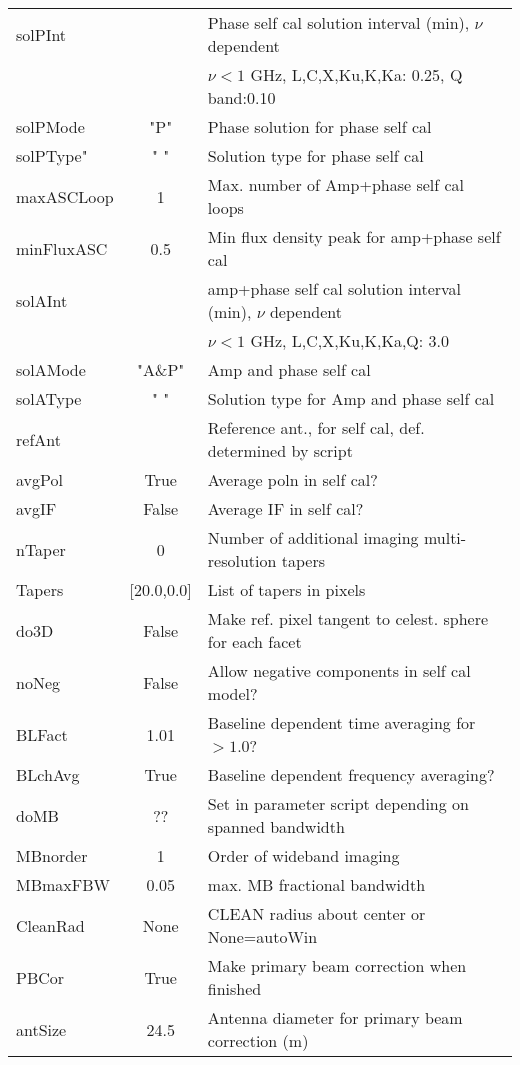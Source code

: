 \documentclass[11pt]{article}
\begin{document}
\begin{enumerate}
\begin{center}
\begin{tabular}{|l|c|l|}
solPInt     &          & Phase self cal solution interval (min), $\nu$ dependent \\
            &          &       $\nu<1$ GHz, L,C,X,Ku,K,Ka: 0.25, Q band:0.10\\
solPMode    & "P"      & Phase solution for phase self cal\\
solPType"   & "    "   & Solution type for phase self cal\\
maxASCLoop  & 1        & Max. number of Amp+phase self cal loops\\
minFluxASC  & 0.5      & Min flux density peak for amp+phase self cal\\
solAInt     &          & amp+phase self cal solution interval (min),
$\nu$ dependent\\
            &          & $\nu<1$ GHz, L,C,X,Ku,K,Ka,Q: 3.0\\
solAMode    & "A\&P"   & Amp and phase self cal \\
solAType    & "    "   & Solution type for Amp and phase self cal\\
refAnt      &      & Reference ant., for self cal, def. determined by script \\
avgPol      & True     & Average poln in self cal?\\
avgIF       & False    & Average IF in self cal?\\
nTaper      & 0        & Number of additional imaging multi-resolution tapers\\
Tapers      & [20.0,0.0] &  List of tapers in pixels\\
do3D        & False    & Make ref. pixel tangent to celest. sphere for each facet\\
noNeg       & False    & Allow negative components in self cal model?\\
BLFact      & 1.01     & Baseline dependent time averaging for $>1.0$?\\
BLchAvg     & True     & Baseline dependent frequency averaging?\\
doMB        &  ??      & Set in parameter script depending on spanned bandwidth\\
MBnorder    & 1        & Order of wideband imaging \\
MBmaxFBW    & 0.05     & max. MB fractional bandwidth\\
CleanRad    & None     & CLEAN radius about center or None=autoWin\\
PBCor       & True     & Make primary beam correction when finished\\
antSize     & 24.5     & Antenna diameter for primary beam correction (m) \\

\end{tabular}
\end{center}
\end{enumerate}
\end{document}
